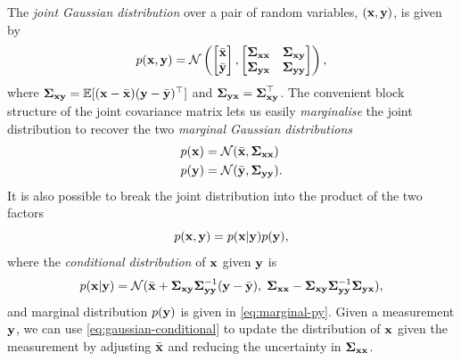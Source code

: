 The \emph{joint Gaussian distribution} over a pair of random variables, $(\vecx, \vecy)$, is given by
\begin{equation}
  p(\vecx, \vecy) = \cN \left(
  \begin{bmatrix}
    \bar{\vecx}\\
    \bar{\vecy}
  \end{bmatrix},
   \begin{bmatrix}
    \matSigma_{\vecx\vecx} & \matSigma_{\vecx\vecy}\\
    \matSigma_{\vecy\vecx} & \matSigma_{\vecy\vecy}
  \end{bmatrix} 
  \right),
\end{equation}
where $\matSigma_{\vecx\vecy} = \bbE [(\vecx - \bar{\vecx}) (\vecy - \bar{\vecy})\trans]$ and $\matSigma_{\vecy\vecx} = \matSigma_{\vecx\vecy}\trans$.
The convenient block structure of the joint covariance matrix lets us easily \emph{marginalise} the joint distribution to recover the two \emph{marginal Gaussian distributions}
\begin{align}
  p(\vecx) &= \cN(\bar{\vecx}, \matSigma_{\vecx\vecx})\\
  p(\vecy) &= \cN(\bar{\vecy}, \matSigma_{\vecy\vecy}). \label{eq:marginal-py}
\end{align}
It is also possible to break the joint distribution into the product of the two factors
\begin{equation}
  p(\vecx, \vecy) = p(\vecx | \vecy) p(\vecy),
\end{equation}
where the \emph{conditional distribution} of $\vecx$ given $\vecy$ is
\begin{equation} \label{eq:gaussian-conditional}
  p(\vecx | \vecy) = \cN(\bar{\vecx} + \matSigma_{\vecx\vecy}\matSigma_{\vecy\vecy}^{-1}(\vecy - \bar{\vecy}),\; \matSigma_{\vecx\vecx} - \matSigma_{\vecx\vecy}\matSigma_{\vecy\vecy}^{-1}\matSigma_{\vecy\vecx}),
\end{equation}
and marginal distribution $p(\vecy)$ is given in \eqref{eq:marginal-py}.
Given a measurement $\vecy$, we can use \eqref{eq:gaussian-conditional} to update the distribution of $\vecx$ given the measurement by adjusting $\bar{\vecx}$ and reducing the uncertainty in $\matSigma_{\vecx\vecx}$.

